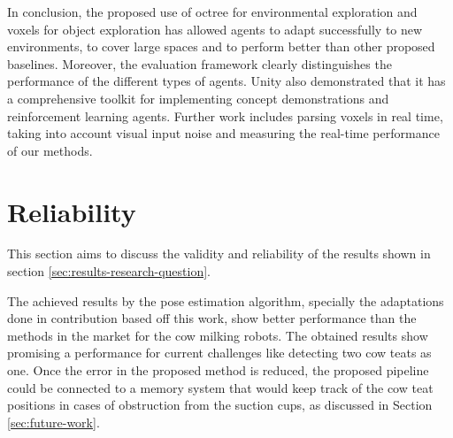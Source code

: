 
        
    
    In conclusion, the proposed use of octree for environmental exploration and voxels for object exploration has allowed agents to adapt successfully to new environments, to cover large spaces and to perform better than other proposed baselines. Moreover, the evaluation framework clearly distinguishes the performance of the different types of agents. Unity also demonstrated that it has a comprehensive toolkit for implementing concept demonstrations and reinforcement learning agents. Further work includes parsing voxels in real time, taking into account visual input noise and measuring the real-time performance of our methods.


\section{Reliability}\label{sec:results-reliability}
    This section aims to discuss the validity and reliability of the results shown in section \ref{sec:results-research-question}.
    
    The achieved results by the pose estimation algorithm, specially the adaptations done in contribution based off this work, show better performance than the methods in the market for the cow milking robots. The obtained results show promising a performance for current challenges like detecting two cow teats as one. Once the error in the proposed method is reduced, the proposed pipeline could be connected to a memory system that would keep track of the cow teat positions in cases of obstruction from the suction cups, as discussed in Section \ref{sec:future-work}.
    
